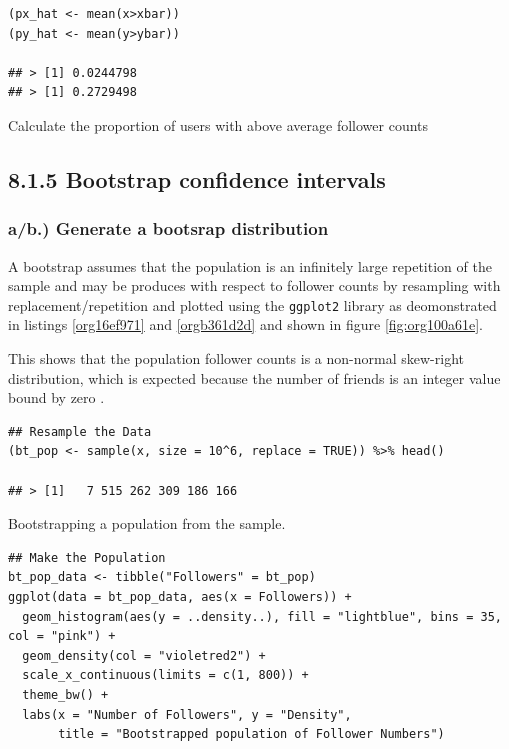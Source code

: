 \documentclass[11pt]{article}
\begin{document}
\begin{listing}[htbp]
\begin{verbatim}
(px_hat <- mean(x>xbar))
(py_hat <- mean(y>ybar))

## > [1] 0.0244798
## > [1] 0.2729498
\end{verbatim}
\caption{\label{orgaf3bf4d}Calculate the proportion of users with above average follower counts}
\end{listing}


\subsection{8.1.5 Bootstrap confidence intervals}
\label{sec:org1c272ac}
\subsubsection{a/b.) Generate a bootsrap distribution}
\label{sec:org297260f}

A bootstrap assumes that the population is an infinitely large repetition of the
sample and may be produces with respect to follower counts by resampling with
replacement/repetition and plotted using the \texttt{ggplot2} library as deomonstrated
in listings \ref{org16ef971} and \ref{orgb361d2d} and shown in figure \ref{fig:org100a61e}.

This shows that the population follower counts is a non-normal skew-right
distribution, which is expected because the number of friends is an integer value bound by zero \cite{nist2013}.

\begin{listing}[htbp]
\begin{verbatim}
## Resample the Data
(bt_pop <- sample(x, size = 10^6, replace = TRUE)) %>% head()

## > [1]   7 515 262 309 186 166
\end{verbatim}
\caption{\label{org16ef971}Bootstrapping a population from the sample.}
\end{listing}

\begin{listing}[htbp]
\begin{verbatim}
## Make the Population
bt_pop_data <- tibble("Followers" = bt_pop)
ggplot(data = bt_pop_data, aes(x = Followers)) +
  geom_histogram(aes(y = ..density..), fill = "lightblue", bins = 35, col = "pink") +
  geom_density(col = "violetred2") +
  scale_x_continuous(limits = c(1, 800)) +
  theme_bw() +
  labs(x = "Number of Followers", y = "Density",
       title = "Bootstrapped population of Follower Numbers")

\end{verbatim}
\label{orgb361d2d}
\end{listing}
\end{document}
